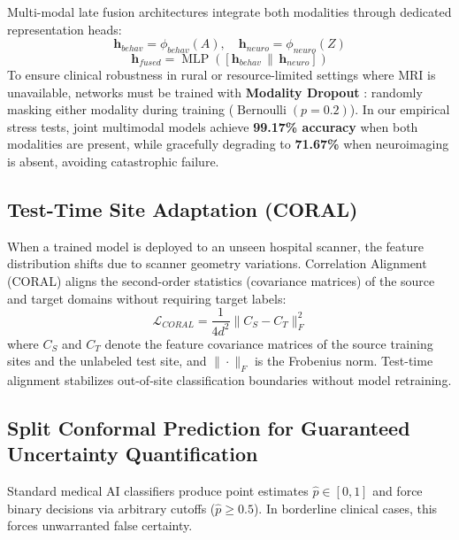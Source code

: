 \documentclass[journal]{IEEEtran}
\begin{document}
Multi-modal late fusion architectures integrate both modalities through dedicated representation heads:
\begin{equation}
\mathbf{h}_{behav} = \phi_{behav}(A), \quad \mathbf{h}_{neuro} = \phi_{neuro}(Z)
\end{equation}
\begin{equation}
\mathbf{h}_{fused} = \operatorname{MLP}\left([\mathbf{h}_{behav} \,\|\, \mathbf{h}_{neuro}]\right)
\end{equation}
To ensure clinical robustness in rural or resource-limited settings where MRI is unavailable, networks must be trained with \textbf{Modality Dropout} \cite{neverova2016modality}: randomly masking either modality during training ($\operatorname{Bernoulli}(p = 0.2)$). In our empirical stress tests, joint multimodal models achieve \textbf{99.17\% accuracy} when both modalities are present, while gracefully degrading to \textbf{71.67\%} when neuroimaging is absent, avoiding catastrophic failure.

\subsection{Test-Time Site Adaptation (CORAL)}
When a trained model is deployed to an unseen hospital scanner, the feature distribution shifts due to scanner geometry variations. Correlation Alignment (CORAL) \cite{sun2016deep} aligns the second-order statistics (covariance matrices) of the source and target domains without requiring target labels:
\begin{equation}
\mathcal{L}_{CORAL} = \frac{1}{4 d^2} \|C_S - C_T\|_F^2
\end{equation}
where $C_S$ and $C_T$ denote the feature covariance matrices of the source training sites and the unlabeled test site, and $\|\cdot\|_F$ is the Frobenius norm. Test-time alignment stabilizes out-of-site classification boundaries without model retraining.

\subsection{Split Conformal Prediction for Guaranteed Uncertainty Quantification}
Standard medical AI classifiers produce point estimates $\hat{p} \in [0, 1]$ and force binary decisions via arbitrary cutoffs ($\hat{p} \ge 0.5$). In borderline clinical cases, this forces unwarranted false certainty.
\end{document}
